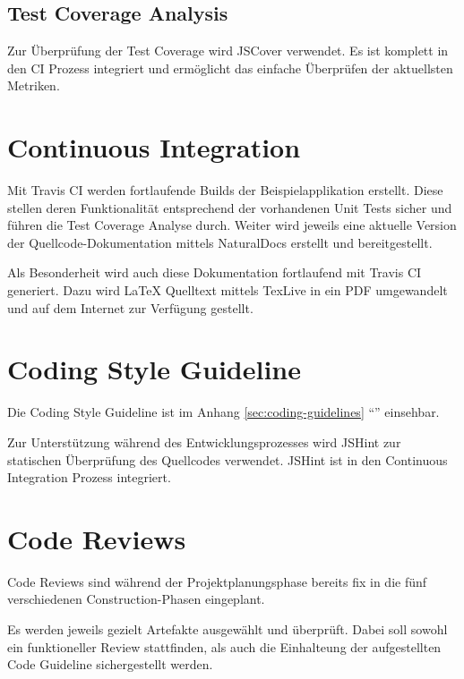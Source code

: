\subsection{Test Coverage Analysis}
Zur Überprüfung der Test Coverage wird JSCover \cite{JSCover} verwendet. Es ist komplett in den \gls{CI} Prozess integriert und ermöglicht das einfache Überprüfen der aktuellsten Metriken.


\section{Continuous Integration}
\label{sec:continuousintegration}

Mit Travis CI \cite{TravisCI} werden fortlaufende Builds der Beispielapplikation erstellt. Diese stellen deren Funktionalität entsprechend der vorhandenen Unit Tests sicher und führen die Test Coverage Analyse durch.
Weiter wird jeweils eine aktuelle Version der Quellcode-Dokumentation mittels NaturalDocs erstellt und bereitgestellt.

Als Besonderheit wird auch diese Dokumentation fortlaufend mit Travis CI generiert. Dazu wird LaTeX Quelltext mittels TexLive in ein PDF umgewandelt und auf dem Internet zur Verfügung gestellt.

\section{Coding Style Guideline}
Die Coding Style Guideline ist im Anhang \ref{sec:coding-guidelines} ``'' einsehbar.

Zur Unterstützung während des Entwicklungsprozesses wird JSHint \cite{JSHint} zur statischen Überprüfung des Quellcodes verwendet. JSHint ist in den Continuous Integration Prozess integriert.


\section{Code Reviews}
Code Reviews sind während der Projektplanungsphase bereits fix in die fünf verschiedenen Construction-Phasen eingeplant.

Es werden jeweils gezielt Artefakte ausgewählt und überprüft. Dabei soll sowohl ein funktioneller Review stattfinden, als auch die Einhalteung der aufgestellten Code Guideline sichergestellt werden.